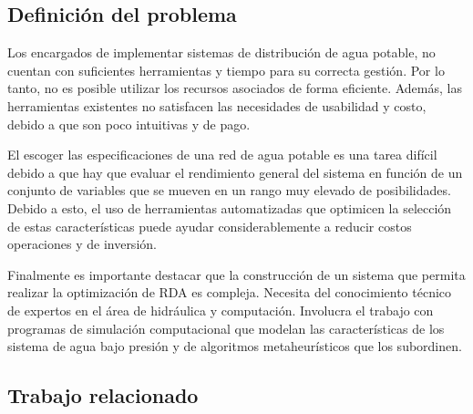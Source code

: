 \documentclass[11pt,letterpaper]{article}
\begin{document}
\subsection{Definición del problema} 

Los encargados de implementar sistemas de distribución de agua potable, no cuentan con suficientes herramientas y tiempo para su correcta gestión. Por lo tanto, no es posible utilizar los recursos asociados de forma eficiente. Además, las herramientas existentes no satisfacen las necesidades de usabilidad y costo, debido a que son poco intuitivas y de pago.

El escoger las especificaciones de una red de agua potable es una tarea difícil debido a que hay que evaluar el rendimiento general del sistema en función de un conjunto de variables que se mueven en un rango muy elevado de posibilidades. Debido a esto, el uso de herramientas automatizadas que optimicen la selección de estas características puede ayudar considerablemente a reducir costos operaciones y de inversión.

Finalmente es importante destacar que la construcción de un sistema que permita realizar la optimización de RDA es compleja. Necesita del conocimiento técnico de expertos en el área de hidráulica y computación. Involucra el trabajo con programas de simulación computacional que modelan las características de los sistema de agua bajo presión y de algoritmos metaheurísticos que los subordinen.   





\subsection{Trabajo relacionado} 
\end{document}

